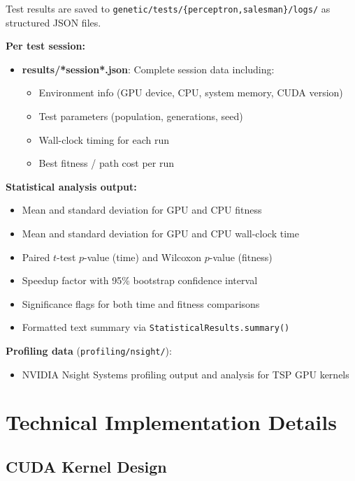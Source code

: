 \documentclass[a4paper,14pt]{extarticle}
\begin{document}
Test results are saved to \texttt{genetic/tests/\{perceptron,salesman\}/logs/} as structured
JSON files.

\textbf{Per test session:}
\begin{itemize}
  \item \textbf{results/*session*.json}: Complete session data including:
    \begin{itemize}
      \item Environment info (GPU device, CPU, system memory, CUDA version)
      \item Test parameters (population, generations, seed)
      \item Wall-clock timing for each run
      \item Best fitness / path cost per run
    \end{itemize}
\end{itemize}

\textbf{Statistical analysis output:}
\begin{itemize}
  \item Mean and standard deviation for GPU and CPU fitness
  \item Mean and standard deviation for GPU and CPU wall-clock time
  \item Paired $t$-test $p$-value (time) and Wilcoxon $p$-value (fitness)
  \item Speedup factor with 95\% bootstrap confidence interval
  \item Significance flags for both time and fitness comparisons
  \item Formatted text summary via \texttt{StatisticalResults.summary()}
\end{itemize}

\textbf{Profiling data} (\texttt{profiling/nsight/}):
\begin{itemize}
  \item NVIDIA Nsight Systems profiling output and analysis for TSP GPU kernels
\end{itemize}


\section{Technical Implementation Details}

\subsection{CUDA Kernel Design}
\end{document}
